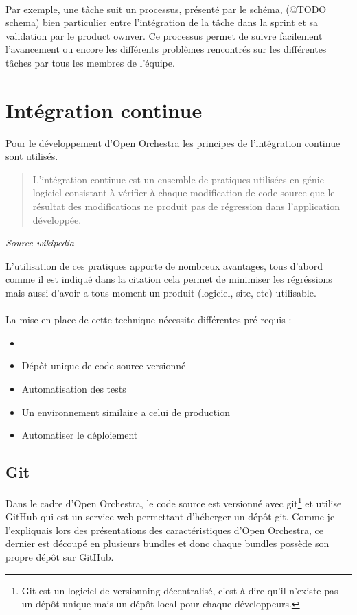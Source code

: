 \paragraph{}
Par exemple, une tâche suit un processus, présenté par le schéma, (@TODO schema) bien particulier entre l'intégration de la tâche dans la sprint et sa validation par le product ownver. Ce processus permet de suivre facilement l'avancement ou encore les différents problèmes rencontrés sur les différentes tâches par tous les membres de l'équipe.
\section{Intégration continue}
Pour le développement d'Open Orchestra les principes de l'intégration continue sont utilisés. 
\newline
\begin{quotation}
L'intégration continue est un ensemble de pratiques utilisées en génie logiciel consistant à vérifier à chaque modification de code source que le résultat des modifications ne produit pas de régression dans l'application développée.
\end{quotation}
\textit{Source wikipedia}

L'utilisation de ces pratiques apporte de nombreux avantages, tous d'abord comme il est indiqué dans la citation cela permet de minimiser les régréssions mais aussi d'avoir a tous moment un produit (logiciel, site, etc) utilisable.
\paragraph{}
La mise en place de cette technique nécessite différentes pré-requis : 
\begin{itemize}
\item[]
\item Dépôt unique de code source versionné
\item Automatisation des tests
\item Un environnement similaire a celui de production
\item Automatiser le déploiement
\end{itemize}

\subsection{Git}
Dans le cadre d'Open Orchestra, le code source est versionné avec git\footnote{Git est un logiciel de versionning décentralisé, c'est-à-dire qu'il n'existe pas un dépôt unique mais un dépôt local pour chaque développeurs.} et utilise GitHub qui est un service web permettant d'héberger un dépôt git. Comme je l'expliquais lors des présentations des caractéristiques d'Open Orchestra, ce dernier est découpé en plusieurs bundles et donc chaque bundles possède son propre dépôt sur GitHub.
